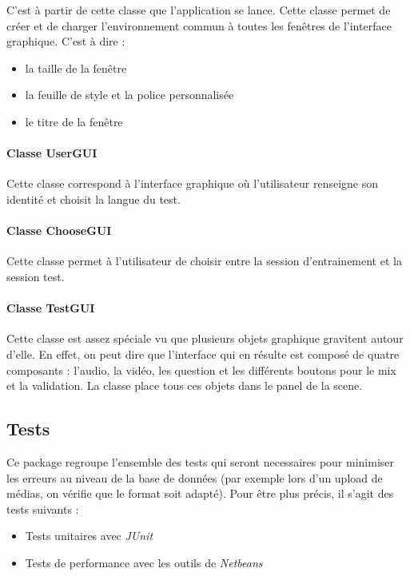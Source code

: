 C'est à partir de cette classe que l'application se lance.
Cette classe permet de créer et de charger l'environnement commun à toutes les fenêtres de l'interface graphique. C'est à dire :
\begin{itemize}
 \item la taille de la fenêtre
 \item la feuille de style  et la police personnalisée
 \item le titre de la fenêtre
\end{itemize}


\paragraph{Classe UserGUI}

Cette classe correspond à l'interface graphique où l'utilisateur renseigne son identité et choisit la langue du test.

\paragraph{Classe ChooseGUI}

Cette classe permet à l'utilisateur de choisir entre la session d'entrainement et la session test.

\paragraph{Classe TestGUI}

Cette classe est assez spéciale vu que plusieurs objets graphique gravitent autour d'elle. En effet, on peut dire que l'interface qui en résulte est composé de quatre composants : l'audio, la vidéo, les question et les différents boutons pour le mix et la validation. La classe place tous ces objets dans le panel de la scene. 


\subsection{Tests}

Ce package regroupe l'ensemble des tests qui seront necessaires pour minimiser les erreurs au niveau de la base de données (par exemple lors d'un upload de médias, on vérifie que le format soit adapté). Pour être plus précis, il s'agit des tests suivants :
\begin{itemize}
 \item Tests unitaires avec \textit{JUnit}
 \item Tests de performance avec les outils de \textit{Netbeans}
\end{itemize}